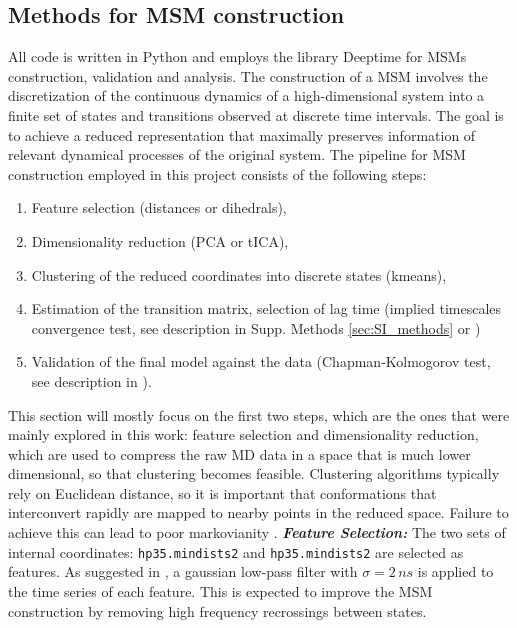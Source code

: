 \documentclass[prl,twocolumn]{revtex4-1}
\begin{document}
\subsection{Methods for MSM construction}
All code is written in Python and employs the library Deeptime \cite{deeptime} for MSMs construction, validation and analysis.
\newline
The construction of a MSM involves the discretization of the continuous dynamics of a high-dimensional system into a finite set of states and transitions observed at discrete time intervals. The goal is to achieve a reduced representation that maximally preserves information of relevant dynamical processes of the original system. 
The pipeline for MSM construction employed in this project consists of the following steps:
\begin{enumerate}
    \setlength{\itemsep}{0.01em}
\item Feature selection (distances or dihedrals),
\item Dimensionality reduction (PCA or tICA),
\item Clustering of the reduced coordinates into discrete states (kmeans),
\item Estimation of the transition matrix, selection of lag time (implied timescales convergence test, see description in Supp. Methods \ref{sec:SI_methods} or \cite[Ch. 2.4.1]{thebible})
\item Validation of the final model against the data (Chapman-Kolmogorov test, see description in \cite[ch. 4.8]{thebible}).
\end{enumerate}
This section will mostly focus on the first two steps, which are the ones that were mainly explored in this work: feature selection and dimensionality reduction, which are used to compress the raw MD data in a space that is much lower dimensional, so that clustering becomes feasible.
Clustering algorithms typically rely on Euclidean distance, so it is important that conformations that interconvert rapidly are mapped to nearby points in the reduced space. Failure to achieve this can lead to poor markovianity \cite{thebible}.
\vspace{0.2em}
\newline \textbf{\textit{Feature Selection:}}
The two sets of internal coordinates: \texttt{hp35.mindists2} and \texttt{hp35.mindists2} are selected as features. As suggested in \cite{selecting_features}, a gaussian low-pass filter with $\sigma = 2\,ns$ is applied to the time series of each feature. This is expected to improve the MSM construction by removing high frequency recrossings between states.
\end{document}
